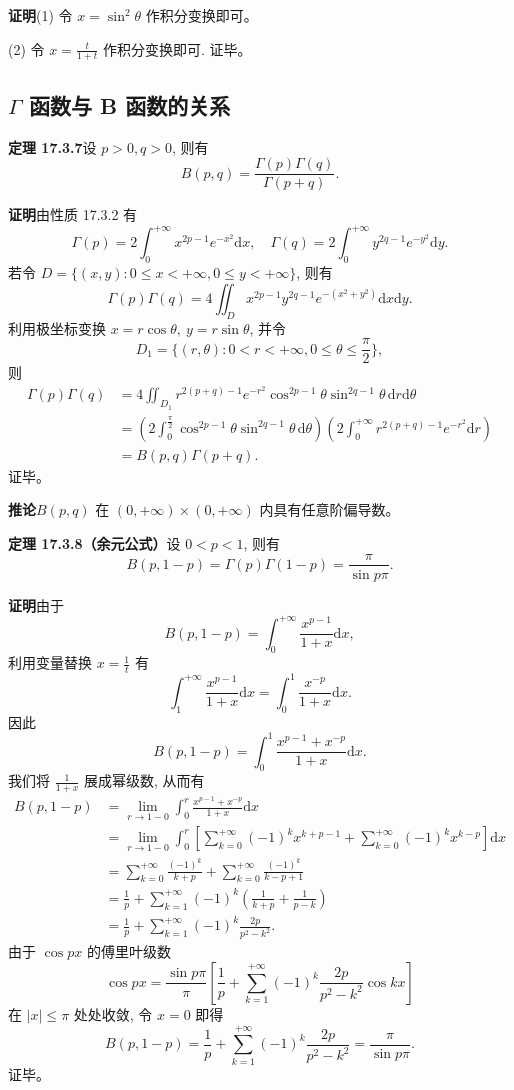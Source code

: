 \documentclass[UTF8, 12pt, fontset=fandol, oneside]{ctexart}
\begin{document}
\noindent\textbf{证明}\quad (1) 令 $x=\sin^2\theta$ 作积分变换即可。

(2) 令 $x=\frac{t}{1+t}$ 作积分变换即可. 证毕。

\subsection{$\Gamma$ 函数与 B 函数的关系}

\noindent\textbf{定理 17.3.7}\quad 设 $p>0,q>0$, 则有
\[
  B(p,q)=\frac{\Gamma(p)\Gamma(q)}{\Gamma(p+q)}.
\]

\noindent\textbf{证明}\quad 由性质 17.3.2 有
\[
  \Gamma(p)=2\int_0^{+\infty}x^{2p-1}e^{-x^2}\mathrm dx,\quad
  \Gamma(q)=2\int_0^{+\infty}y^{2q-1}e^{-y^2}\mathrm dy.
\]
若令 $D=\{(x,y):0\leqslant x<+\infty,0\leqslant y<+\infty\}$, 则有
\[
  \Gamma(p)\Gamma(q)
  =4\iint_D x^{2p-1}y^{2q-1}e^{-(x^2+y^2)}\mathrm dx\mathrm dy.
\]
利用极坐标变换 $x=r\cos\theta,\ y=r\sin\theta$, 并令
\[
  D_1=\{(r,\theta):0<r<+\infty,0\leqslant\theta\leqslant\frac\pi2\},
\]
则
\[
\begin{aligned}
  \Gamma(p)\Gamma(q)
  &=4\iint_{D_1}r^{2(p+q)-1}e^{-r^2}
    \cos^{2p-1}\theta\sin^{2q-1}\theta\,\mathrm dr\mathrm d\theta\\
  &=
  \left(2\int_0^{\frac\pi2}\cos^{2p-1}\theta\sin^{2q-1}\theta\,\mathrm d\theta\right)
  \left(2\int_0^{+\infty}r^{2(p+q)-1}e^{-r^2}\mathrm dr\right)\\
  &=B(p,q)\Gamma(p+q).
\end{aligned}
\]
证毕。

\noindent\textbf{推论}\quad $B(p,q)$ 在 $(0,+\infty)\times(0,+\infty)$ 内具有任意阶偏导数。

\noindent\textbf{定理 17.3.8（余元公式）}\quad 设 $0<p<1$, 则有
\[
  B(p,1-p)=\Gamma(p)\Gamma(1-p)=\frac{\pi}{\sin p\pi}.
\]

\noindent\textbf{证明}\quad 由于
\[
  B(p,1-p)=\int_0^{+\infty}\frac{x^{p-1}}{1+x}\mathrm dx,
\]
利用变量替换 $x=\frac1t$ 有
\[
  \int_1^{+\infty}\frac{x^{p-1}}{1+x}\mathrm dx
  =\int_0^1\frac{x^{-p}}{1+x}\mathrm dx.
\]
因此
\[
  B(p,1-p)=\int_0^1\frac{x^{p-1}+x^{-p}}{1+x}\mathrm dx.
\]
我们将 $\frac1{1+x}$ 展成幂级数, 从而有
\[
\begin{aligned}
  B(p,1-p)
  &=\lim_{r\to1-0}\int_0^r\frac{x^{p-1}+x^{-p}}{1+x}\mathrm dx\\
  &=\lim_{r\to1-0}\int_0^r
  \left[\sum_{k=0}^{+\infty}(-1)^k x^{k+p-1}
  +\sum_{k=0}^{+\infty}(-1)^k x^{k-p}\right]\mathrm dx\\
  &=\sum_{k=0}^{+\infty}\frac{(-1)^k}{k+p}
  +\sum_{k=0}^{+\infty}\frac{(-1)^k}{k-p+1}\\
  &=\frac1p+\sum_{k=1}^{+\infty}(-1)^k
  \left(\frac1{k+p}+\frac1{p-k}\right)\\
  &=\frac1p+\sum_{k=1}^{+\infty}(-1)^k\frac{2p}{p^2-k^2}.
\end{aligned}
\]
由于 $\cos px$ 的傅里叶级数
\[
  \cos px=\frac{\sin p\pi}{\pi}
  \left[\frac1p+\sum_{k=1}^{+\infty}(-1)^k\frac{2p}{p^2-k^2}\cos kx\right]
\]
在 $|x|\leqslant\pi$ 处处收敛, 令 $x=0$ 即得
\[
  B(p,1-p)=\frac1p+\sum_{k=1}^{+\infty}(-1)^k\frac{2p}{p^2-k^2}
  =\frac{\pi}{\sin p\pi}.
\]
证毕。
\end{document}

